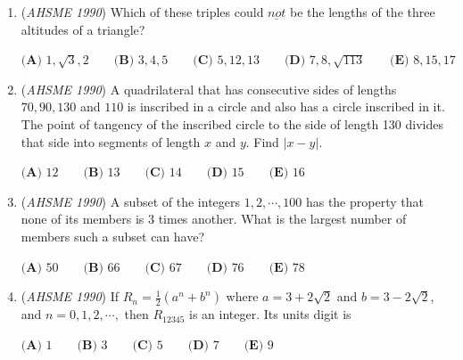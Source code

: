 \begin{enumerate}
The number picked by the person who announced the average $6$ was


 $\textbf{(A) } 1 \qquad  \textbf{(B) } 5 \qquad  \textbf{(C) } 6 \qquad  \textbf{(D) } 10 \qquad \textbf{(E) }\text{not uniquely determined from the given information}$


	\item (\textit{AHSME 1990}) Which of these triples could $\underline{not}$ be the lengths of the three altitudes of a triangle?


 $\textbf{(A) } 1,\sqrt{3},2\qquad \textbf{(B) } 3,4,5\qquad \textbf{(C) } 5,12,13\qquad \textbf{(D) } 7,8,\sqrt{113}\qquad \textbf{(E) } 8,15,17$


	\item (\textit{AHSME 1990}) A quadrilateral that has consecutive sides of lengths $70,90,130$ and $110$ is inscribed in a circle and also has a circle inscribed in it. The point of tangency of the inscribed circle to the side of length 130 divides that side into segments of length $x$ and $y$. Find $|x-y|$.


 $\textbf{(A) } 12\qquad \textbf{(B) } 13\qquad \textbf{(C) } 14\qquad \textbf{(D) } 15\qquad \textbf{(E) } 16$


	\item (\textit{AHSME 1990}) A subset of the integers $1,2,\cdots,100$ has the property that none of its members is 3 times another. What is the largest number of members such a subset can have?


 $\textbf{(A) } 50\qquad \textbf{(B) } 66\qquad \textbf{(C) } 67\qquad \textbf{(D) } 76\qquad \textbf{(E) } 78$


	\item (\textit{AHSME 1990}) If $R_n=\frac{1}{2}(a^n+b^n)$  where $a=3+2\sqrt{2}$ and $b=3-2\sqrt{2}$, and $n=0,1,2,\cdots,$ then $R_{12345}$ is an integer.  Its units digit is


 $\textbf{(A) } 1\qquad \textbf{(B) } 3\qquad \textbf{(C) } 5\qquad \textbf{(D) } 7\qquad \textbf{(E) } 9$


\end{enumerate}